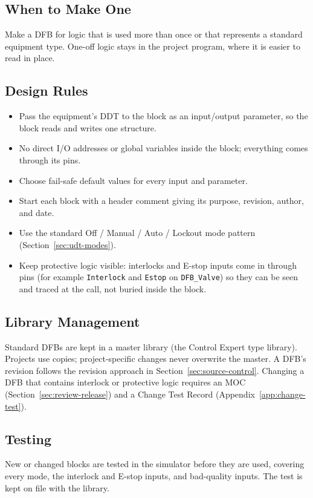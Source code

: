 \subsection{When to Make One}
Make a DFB for logic that is used more than once or that represents a standard equipment type. One-off logic stays in the project program, where it is easier to read in place.

\subsection{Design Rules}
\begin{itemize}[itemsep=1pt]
  \item Pass the equipment's DDT to the block as an input/output parameter, so the block reads and writes one structure.
  \item No direct I/O addresses or global variables inside the block; everything comes through its pins.
  \item Choose fail-safe default values for every input and parameter.
  \item Start each block with a header comment giving its purpose, revision, author, and date.
  \item Use the standard Off / Manual / Auto / Lockout mode pattern (Section~\ref{sec:udt-modes}).
  \item Keep protective logic visible: interlocks and E-stop inputs come in through pins (for example \texttt{Interlock} and \texttt{Estop} on \texttt{DFB\_Valve}) so they can be seen and traced at the call, not buried inside the block.
\end{itemize}

\subsection{Library Management}
Standard DFBs are kept in a master library (the Control Expert type library). Projects use copies; project-specific changes never overwrite the master. A DFB's revision follows the revision approach in Section~\ref{sec:source-control}. Changing a DFB that contains interlock or protective logic requires an MOC (Section~\ref{sec:review-release}) and a Change Test Record (Appendix~\ref{app:change-test}).

\subsection{Testing}
New or changed blocks are tested in the simulator before they are used, covering every mode, the interlock and E-stop inputs, and bad-quality inputs. The test is kept on file with the library.


